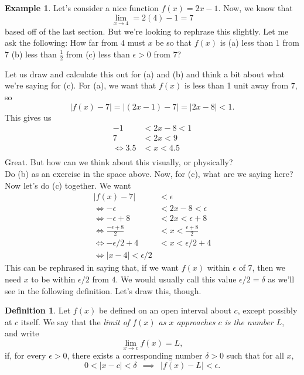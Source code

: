 \documentclass[leqno]{article}
\theoremstyle{definition}
\newtheorem{definition}{Definition}[section]
\newtheorem{example}{Example}[section]
\theoremstyle{remark}
\theoremstyle{theorem}
\begin{document}
\begin{example}
Let's consider a nice function $f(x)=2x-1$.  Now, we know that 
\[
\lim_{x\to 4}=2(4)-1=7
\]
based off of the last section.  But we're looking to rephrase this slightly.  Let me ask the following: How far from $4$ must $x$ be so that $f(x)$ is (a) less than $1$ from 7 (b) less than $\frac{1}{2}$ from (c) less than $\epsilon>0$ from 7?

Let us draw and calculate this out for (a) and (b) and think a bit about what we're saying for (c). For (a), we want that $f(x)$ is less than 1 unit away from 7, so
\[
|f(x)-7|=|(2x-1)-7|=|2x-8|<1.
\]
This gives us
\begin{align*}
-1&<2x-8<1\\
7&<2x<9\\
\iff 3.5&<x<4.5\\
\end{align*}
Great. But how can we think about this visually, or physically?
\vspace*{6cm}\\
Do (b) as an exercise in the space above.  Now, for (c), what are we saying here?
\vspace*{2cm}\\
Now let's do (c) together.  We want 
\begin{align*}
|f(x)-7|&<\epsilon\\
\iff -\epsilon&<2x-8<\epsilon\\
\iff -\epsilon+8&<2x<\epsilon+8\\
\iff \frac{-\epsilon+8}{2}&<x<\frac{\epsilon+8}{2}\\
\iff -\epsilon/2 +4 &<x<\epsilon/2 +4\\
\iff |x-4|<\epsilon/2
\end{align*}
This can be rephrased in saying that, if we want $f(x)$ within $\epsilon$ of $7$, then we need $x$ to be within $\epsilon/2$ from $4$.  We would usually call this value $\epsilon/2=\delta$ as we'll see in the following definition. Let's draw this, though.
\vspace*{4cm}
\end{example}

\begin{definition}
Let $f(x)$ be defined on an open interval about $c$, except possibly at $c$ itself. We say that the \emph{limit of $f(x)$ as $x$ approaches $c$ is the number $L$}, and write
\[
\lim_{x\to c}f(x)=L,
\]
if, for every $\epsilon>0$, there exists a corresponding number $\delta>0$ such that for all $x$,
\[
0<|x-c|<\delta ~~\implies~~ |f(x)-L|<\epsilon.
\]
\end{definition}
\end{document}
